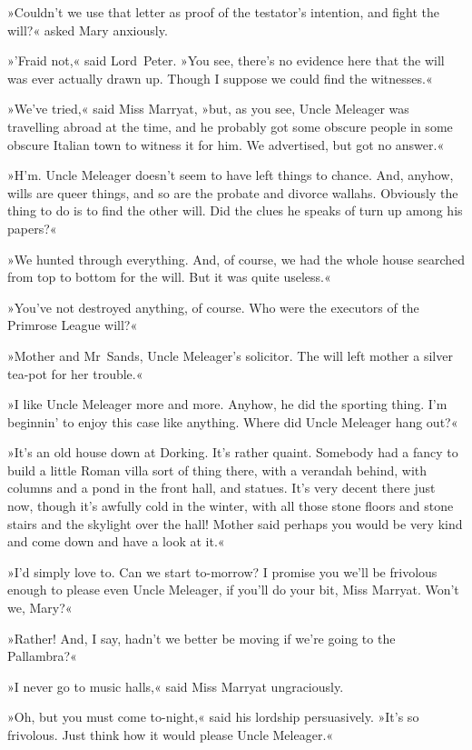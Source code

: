 »Couldn't we use that letter as proof of the testator's intention, and fight the will?« asked Mary anxiously.

»'Fraid not,« said Lord~Peter. »You see, there's no evidence here that the will was ever actually drawn up. Though I suppose we could find the witnesses.«

»We've tried,« said Miss Marryat, »but, as you see, Uncle Meleager was travelling abroad at the time, and he probably got some obscure people in some obscure Italian town to witness it for him. We advertised, but got no answer.«

»H'm. Uncle Meleager doesn't seem to have left things to chance. And, anyhow, wills are queer things, and so are the probate and divorce wallahs. Obviously the thing to do is to find the other will. Did the clues he speaks of turn up among his papers?«

»We hunted through everything. And, of course, we had the whole house searched from top to bottom for the will. But it was quite useless.«

»You've not destroyed anything, of course. Who were the executors of the Primrose League will?«

»Mother and Mr~Sands, Uncle Meleager's solicitor. The will left mother a silver tea-pot for her trouble.«

»I like Uncle Meleager more and more. Anyhow, he did the sporting thing. I'm beginnin' to enjoy this case like anything. Where did Uncle Meleager hang out?«

»It's an old house down at Dorking. It's rather quaint. Somebody had a fancy to build a little Roman villa sort of thing there, with a verandah behind, with columns and a pond in the front hall, and statues. It's very decent there just now, though it's awfully cold in the winter, with all those stone floors and stone stairs and the skylight over the hall! Mother said perhaps you would be very kind and come down and have a look at it.«

»I'd simply love to. Can we start to-morrow? I promise you we'll be frivolous enough to please even Uncle Meleager, if you'll do your bit, Miss Marryat. Won't we, Mary?«

»Rather! And, I say, hadn't we better be moving if we're going to the Pallambra?«

»I never go to music halls,« said Miss Marryat ungraciously.

»Oh, but you must come to-night,« said his lordship persuasively. »It's so frivolous. Just think how it would please Uncle Meleager.«

